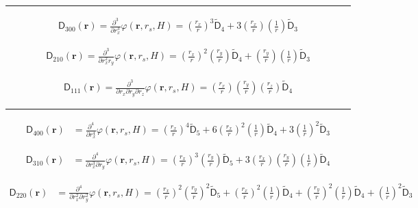 \noindent\rule{6cm}{0.4pt}
\begin{align}
\mathsf{D}_{300}(\mathbf{r}) = \frac{\partial^3}{\partial r_x^3} \varphi (\mathbf{r}, r_s, H) = 
  \left(\frac{r_x}{r}\right)^3 \mathsf{\tilde{D}}_{4}
  + 3 \left(\frac{r_x}{r}\right) \left(\frac{1}{r}\right) \mathsf{\tilde{D}}_{3} \nonumber
\end{align}

\begin{align}
\mathsf{D}_{210}(\mathbf{r}) = \frac{\partial^3}{\partial r_x^2 r_y} \varphi (\mathbf{r}, r_s, H) = 
  \left(\frac{r_x}{r}\right)^2 \left(\frac{r_y}{r}\right) \mathsf{\tilde{D}}_{4} + \left(\frac{r_y}{r}\right) \left(\frac{1}{r}\right) \mathsf{\tilde{D}}_{3} \nonumber
\end{align}

\begin{align}
\mathsf{D}_{111}(\mathbf{r}) = \frac{\partial^3}{\partial r_x\partial r_y\partial r_z} \varphi (\mathbf{r}, r_s, H) = 
\left(\frac{r_x}{r}\right)\left(\frac{r_y}{r}\right)\left(\frac{r_z}{r}\right) \mathsf{\tilde{D}}_{4} \nonumber
\end{align}

\noindent\rule{6cm}{0.4pt}
\begin{align}
  \mathsf{D}_{400}(\mathbf{r}) &= \frac{\partial^4}{\partial r_x^4}
  \varphi (\mathbf{r}, r_s, H) =
  \left(\frac{r_x}{r}\right)^4 \mathsf{\tilde{D}}_{5}+
  6\left(\frac{r_x}{r}\right)^2 \left(\frac{1}{r}\right) \mathsf{\tilde{D}}_{4} +
  3 \left(\frac{1}{r}\right)^2 \mathsf{\tilde{D}}_{3}
  \nonumber
\end{align}

\begin{align}
  \mathsf{D}_{310}(\mathbf{r}) &= \frac{\partial^4}{\partial r_x^3
    \partial r_y} \varphi (\mathbf{r}, r_s, H) =
  \left(\frac{r_x}{r}\right)^3 \left(\frac{r_y}{r}\right) \mathsf{\tilde{D}}_{5} +
  3 \left(\frac{r_x}{r}\right) \left(\frac{r_y}{r}\right) \left(\frac{1}{r}\right) \mathsf{\tilde{D}}_{4}
  \nonumber
\end{align}

\begin{align}
  \mathsf{D}_{220}(\mathbf{r}) &= \frac{\partial^4}{\partial r_x^2
    \partial r_y^2} \varphi (\mathbf{r}, r_s, H) =
    \left(\frac{r_x}{r}\right)^2 \left(\frac{r_y}{r}\right)^2 \mathsf{\tilde{D}}_{5} +
    \left(\frac{r_x}{r}\right)^2 \left(\frac{1}{r}\right) \mathsf{\tilde{D}}_{4} +
    \left(\frac{r_y}{r}\right)^2 \left(\frac{1}{r}\right) \mathsf{\tilde{D}}_{4} +
    \left(\frac{1}{r}\right)^2 \mathsf{\tilde{D}}_{3}
  \nonumber
\end{align}

